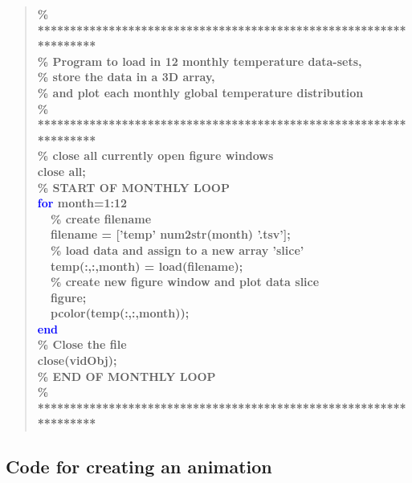 \documentclass{tufte-book} %
\newenvironment{docspecbold}{\begin{quotation}\ttfamily\bfseries\parskip0pt\parindent0pt\ignorespaces}{\end{quotation}}
\begin{document}
\begin{docspecbold}
\textcolor[rgb]{0,0.501961,0}{\% ****************************************************************** 
\\\% Program to load in 12 monthly temperature data-sets,
\\\% store the data in a 3D array,
\\\% and plot each monthly global temperature distribution
\\\% ****************************************************************** 
\\\% close all currently open figure windows}
\\close \textcolor[rgb]{1,0,1}{all};
\\\textcolor[rgb]{0,0.501961,0}{\% START OF MONTHLY LOOP}
\\\textcolor{blue}{for} month=1:12
\\ \ \ \textcolor[rgb]{0,0.501961,0}{\% create filename}
\\ \ \ filename = [\textcolor[rgb]{1,0,1}{'temp'} num2str(month) \textcolor[rgb]{1,0,1}{'.tsv'}];
\\ \ \ \textcolor[rgb]{0,0.501961,0}{\% load data and assign to a new array 'slice'}
\\ \ \ temp(:,:,month) = load(filename);
\\ \ \ \textcolor[rgb]{0,0.501961,0}{\% create new figure window and plot data slice}
\\ \ \ figure;
\\ \ \ pcolor(temp(:,:,month));
\\\textcolor{blue}{end}
\\\textcolor[rgb]{0,0.501961,0}{\% Close the file}
\\close(vidObj);
\textcolor[rgb]{0,0.501961,0}{\\\% END OF MONTHLY LOOP
\\\% ****************************************************************** }
\end{docspecbold}

\subsection*{Code for creating an animation}
\end{document}
